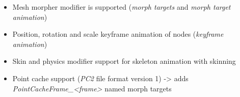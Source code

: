 \begin{itemize}
\item{Mesh morpher modifier is supported (\emph{morph targets} and \emph{morph target animation})}
\item{Position, rotation and scale keyframe animation of nodes (\emph{keyframe animation})}
\item{Skin and physics modifier support for skeleton animation with skinning}
\item{Point cache support (\emph{PC2} file format version 1) -> adds \emph{PointCacheFrame\_<frame>} named morph targets}
\end{itemize}
